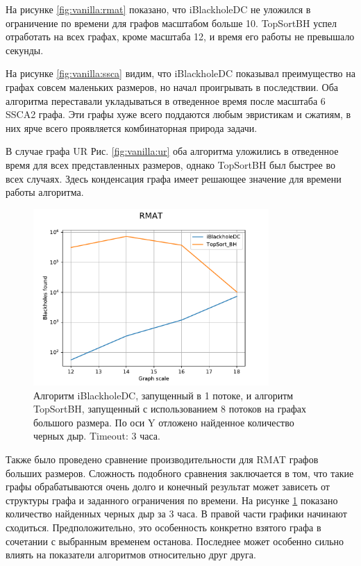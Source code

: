 \documentclass[12pt,a4paper,oneside,openany]{article}
\theoremstyle{definition}
\theoremstyle{lemma}
\theoremstyle{remark}
\begin{document}
На рисунке \ref{fig:vanilla:rmat} показано, что iBlackholeDC не уложился в ограничение по времени для графов масштабом больше 10.
TopSortBH успел отработать на всех графах, кроме масштаба 12, и время его работы не превышало секунды.

На рисунке \ref{fig:vanilla:ssca} видим, что iBlackholeDC показывал преимущество на графах совсем маленьких размеров, но начал проигрывать в последствии.
Оба алгоритма переставали укладываться в отведенное время после масштаба 6 SSCA2 графа. Эти графы хуже всего поддаются любым эвристикам и сжатиям,
в них ярче всего проявляется комбинаторная природа задачи.

В случае графа UR Рис. \ref{fig:vanilla:ur} оба алгоритма уложились в отведенное время для всех представленных размеров, однако TopSortBH был быстрее во всех
случаях. Здесь конденсация графа имеет решающее значение для времени работы алгоритма.

\begin{figure}[H]
    \centering
    \includegraphics[width=0.8\textwidth]{images/1_large_RMAT.pdf}
    \caption{Алгоритм iBlackholeDC, запущенный в 1 потоке, и алгоритм TopSortBH, запущенный с использованием 8 потоков на графах большого размера.
По оси Y отложено найденное количество черных дыр. Timeout: 3 часа.}
    \label{fig:vanillalarge}
\end{figure}

Также было проведено сравнение производительности для RMAT графов больших размеров. Сложность подобного сравнения заключается в том,
что такие графы обрабатываются очень долго и конечный результат может зависеть от структуры графа и заданного ограничения по времени.
На рисунке \ref{fig:vanillalarge} показано количество найденных черных дыр за 3 часа. В правой части графики начинают сходиться.
Предположительно, это особенность конкретно взятого графа в сочетании с выбранным временем останова. Последнее может особенно сильно влиять
на показатели алгоритмов относительно друг друга.
\end{document}
